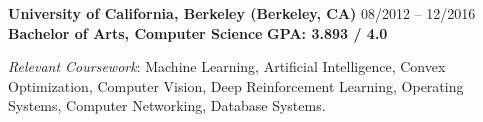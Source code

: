 \documentclass{article}
\begin{document}
\noindent
\textbf{University of California, Berkeley (Berkeley, CA)}
\hfill 08/2012 -- 12/2016 \\
\indent
\textbf{Bachelor of Arts, Computer Science}  
\hfill{\textbf{GPA: 3.893 / 4.0}}\\
\vspace{-3.5mm}

\noindent
\textit{Relevant Coursework}: Machine Learning, Artificial Intelligence, Convex Optimization, Computer Vision, Deep Reinforcement Learning, Operating Systems, Computer Networking, Database Systems.
\vspace{5mm}

% 
\end{document}
